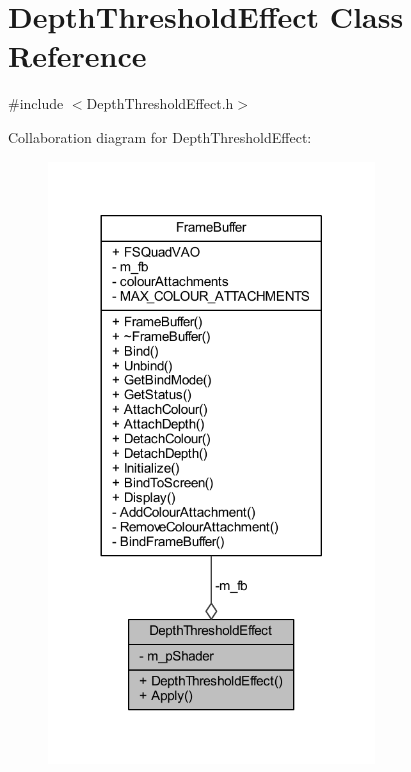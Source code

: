\hypertarget{class_depth_threshold_effect}{}\section{Depth\+Threshold\+Effect Class Reference}
\label{class_depth_threshold_effect}


{\ttfamily \#include $<$Depth\+Threshold\+Effect.\+h$>$}



Collaboration diagram for Depth\+Threshold\+Effect\+:\nopagebreak
\begin{figure}[H]
\begin{center}
\leavevmode
\includegraphics[width=245pt]{class_depth_threshold_effect__coll__graph}
\end{center}
\end{figure}
